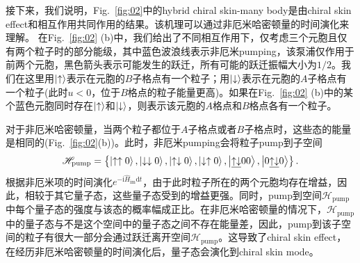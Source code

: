 \documentclass[longbibliography, aps, prx, amsmath, amssymb, amsfonts, twocolumn,superscriptaddress, footinbib]{revtex4-1}
\begin{document}
	接下来，我们说明，Fig.~\ref{fig:02}中的hybrid chiral skin-many body是由chiral skin effect和相互作用共同作用的结果。该机理可以通过非厄米哈密顿量的时间演化来理解。%
	在Fig.~\ref{fig:02} (b)中，我们给出了不同相互作用下，仅考虑三个元胞且仅有两个粒子时的部分能级，其中蓝色波浪线表示非厄米pumping，该泵浦仅作用于前两个元胞，黑色箭头表示可能发生的跃迁，所有可能的跃迁振幅大小为$1/2$。我们在这里用$\ket{\uparrow}$表示在元胞的$B$子格点有一个粒子；用$\ket{\downarrow}$表示在元胞的$A$子格点有一个粒子(此时$u<0$，位于$B$格点的粒子能量更高)。如果在Fig.~\ref{fig:02} (b)中的某个蓝色元胞同时存在$\ket{\uparrow}$和$\ket{\downarrow}$，则表示该元胞的$A$格点和$B$格点各有一个粒子。

	对于非厄米哈密顿量，当两个粒子都位于$A$子格点或者$B$子格点时，这些态的能量是相同的(Fig.~\ref{fig:02}(b))。此时，非厄米pumping会将粒子pump到子空间
	\begin{equation}
		\mathscr{H}_{\text{pump}}=\left\{ \ket{\uparrow\uparrow0}, \ket{\downarrow\downarrow0},\ket{\uparrow\downarrow0},\ket{\downarrow\uparrow0},\ket{\underline{\uparrow\downarrow}00},\ket{0\underline{\uparrow\downarrow}0}\right\}.
	\end{equation}
	根据非厄米项的时间演化$e^{-\mathrm{i}\hat{H}_{\text{im}} \mathrm{d}t}$，由于此时粒子所在的两个元胞均存在增益，因此，相较于其它量子态，这些量子态受到的增益更强。同时，pump到空间$\mathscr{H}_{\text{pump}}$中每个量子态的强度与该态的概率幅成正比。在非厄米哈密顿量的情况下，$\mathscr{H}_{\text{pump}}$中的量子态与不是这个空间中的量子态之间不存在能量差，因此，pump到该子空间的粒子有很大一部分会通过跃迁离开空间$\mathscr{H}_{\text{pump}}$。这导致了chiral skin effect，在经历非厄米哈密顿量的时间演化后，量子态会演化到chiral skin mode。


\end{document}

